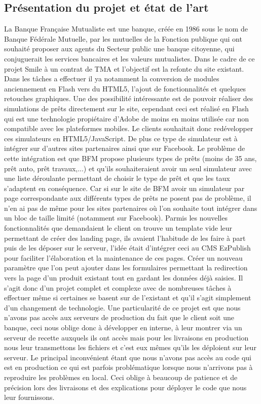 \documentclass[a4paper,11pt,twoside]{report}
\begin{document}
    \subsection*{Présentation du projet et état de l'art}
    La Banque Française Mutualiste est une banque, créée en 1986 sous le nom de Banque Fédérale Mutuelle, par les mutuelles de la Fonction publique qui ont souhaité proposer aux agents du Secteur public une banque citoyenne, qui conjuguerait les services bancaires et les valeurs mutualistes. Dans le cadre de ce projet Smile à un contrat de TMA et l'objectif est la refonte du site existant. Dans les tâches a effectuer il ya notamment la conversion de modules anciennement en Flash vers du HTML5, l'ajout de fonctionnalités et quelques retouches graphiques. Une des possibilité intéressante est de pouvoir réaliser des simulations de prêts directement sur le site, cependant ceci est réalisé en Flash qui est une technologie propiétaire d'Adobe de moins en moins utilisée car non compatible avec les plateformes mobiles. Le clients souhaitait donc redévelopper ces simulateurs en HTML5/JavaScript. De plus ce type de simulateur est à intégrer sur d'autres sites partenaires ainsi que sur Facebook. Le problème de cette intégration est que BFM propose plusieurs types de prêts (moins de 35 ans, prêt auto, prêt travaux,...) et qu'ils souhaiteraient avoir un seul simulateur avec une liste déroulante permettant de choisir le type de prêt et que les taux s'adaptent en conséquence. Car si sur le site de BFM avoir un simulateur par page correspondante aux différents types de prêts ne posent pas de problème, il n'en ai pas de même pour les sites partenaires où l'on souhaite tout intégrer dans un bloc de taille limité (notamment sur Facebook). Parmis les nouvelles fonctionnalités que demandaient le client on trouve un template vide leur permettant de créer des landing page, ils avaient l'habitude de les faire à part puis de les déposer sur le serveur, l'idée était d'intégrer ceci au CMS EzPublish pour faciliter l'élaboration et la maintenance de ces pages. Créer un nouveau paramètre que l'on peut ajouter dans les formulaires permettant la redirection vers la page d'un produit existant tout en gardant les données déjà saisies. Il s'agit donc d'un projet complet et complexe avec de nombreuses tâches à effectuer même si certaines se basent sur de l'existant et qu'il s'agit simplement d'un changement de technologie. Une particularité de ce projet est que nous n'avons pas accès aux serveurs de production du fait que le client soit une banque, ceci nous oblige donc à développer en interne, à leur montrer via un serveur de recette auxquels ils ont accès mais pour les livraisons en production nous leur transmettons les fichiers et c'est eux mêmes qu'ils les déploient sur leur serveur. Le principal inconvénient étant que nous n'avons pas accès au code qui est en production ce qui est parfois problématique lorsque nous n'arrivons pas à reproduire les problèmes en local. Ceci oblige à beaucoup de patience et de précision lors des livraisons et des explications pour déployer le code que nous leur fournissons.  
\end{document}
